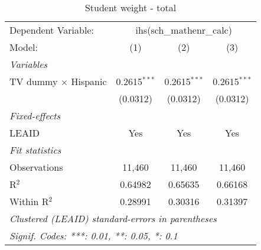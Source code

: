 \begin{table}[htbp]
\centering
\caption{Student weight - total}
\begin{tabular}{lccc}
\tabularnewline\midrule\midrule
Dependent Variable:&\multicolumn{3}{c}{ihs(sch\_mathenr\_calc)}\\
Model:&(1) & (2) & (3)\\
\midrule \emph{Variables}&   &   &  \\
TV dummy $\times$ Hispanic & 0.2615$^{***}$ & 0.2615$^{***}$ & 0.2615$^{***}$\\
  &(0.0312) & (0.0312) & (0.0312)\\
\midrule \emph{Fixed-effects}&   &   &  \\
LEAID & Yes & Yes & Yes\\
\midrule \emph{Fit statistics}&  & & \\
Observations & 11,460&11,460&11,460\\
R$^2$ & 0.64982&0.65635&0.66168\\
Within R$^2$ & 0.28991&0.30316&0.31397\\
\midrule\midrule\multicolumn{4}{l}{\emph{Clustered (LEAID) standard-errors in parentheses}}\\
\multicolumn{4}{l}{\emph{Signif. Codes: ***: 0.01, **: 0.05, *: 0.1}}\\
\end{tabular}
\end{table}

